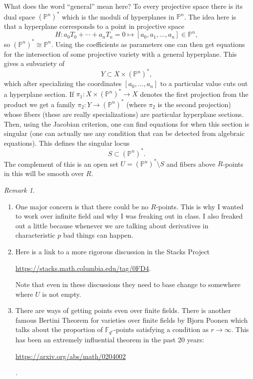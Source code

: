 \documentclass[12pt]{article}
\numberwithin{equation}{section}
\theoremstyle{definition}
\theoremstyle{remark}
\newtheorem{remark}[theorem]{Remark}
\newcommand{\FF}{\mathbb{F}}
\newcommand{\PP}{\mathbb{P}}
\begin{document}
What does the word ``general'' mean here?
To every projective space there is its dual space $(\PP^n)^*$ which is the moduli of hyperplanes in $\PP^n$. 
The idea here is that a hyperplane corresponds to a point in projective space 
 $$ H: a_0 T_0 + \cdots + a_n T_n =0 \mapsto  [a_0,a_1,\ldots,a_n]\in \PP^n,$$
so $(\PP^n)^*\cong \PP^n$. 
Using the coefficients as parameters one can then get equations for the intersection of some projective variety with a general hyperplane. 
This gives a subvariety of 
 $$ Y \subset X\times (\PP^n)^*,$$
which after specializing the coordinates $[a_0,\ldots,a_n]$ to a particular value cuts out a hyperplane section. 
If $\pi_1: X \times (\PP^n)^*\to X$ denotes the first projection from the product we get a family $\pi_2:Y \to (\PP^n)^*$ (where $\pi_2$ is the second projection) whose fibers (these are really specializations) are particular hyperplane sections.
Then, using the Jacobian criterion, one can find equations for when this section is singular (one can actually use any condition that can be detected from algebraic equations).
This defines the singular locus
 $$ S \subset (\PP^n)^*. $$
The complement  of this is an open set $U = (\PP^n)^*\setminus S$ and fibers above $R$-points in this will be smooth over $R$.

\begin{remark}
\begin{enumerate}
	\item One major concern is that there could be no $R$-points. This is why I wanted to work over infinite field and why I was freaking out in class. 
	I also freaked out a little because whenever we are talking about derivatives in characteristic $p$ bad things can happen.
	\item Here is a link to a more rigorous discussion in the Stacks Project
	\begin{center}
	 \url{https://stacks.math.columbia.edu/tag/0FD4}.
	 \end{center}
 	Note that even in these discussions they need to base change to somewhere where $U$ is not empty. 
	\item There are ways of getting points even over finite fields. 
	There is another famous Bertini Theorem for varieties over finite fields by Bjorn Poonen which talks about the proportion of $\FF_{q^r}$-points satisfying a condition as $r\to \infty$. 
	This has been an extremely influential theorem in the past 20 years:
	\begin{center} 
		\url{https://arxiv.org/abs/math/0204002}
	\end{center}.
\end{enumerate}

\end{remark}
\end{document}
